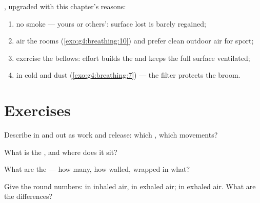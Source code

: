\begin{method}\label{met:g7:lungs-and-gas-exchange:keep}
, upgraded with this
chapter's reasons:
\begin{enumerate}
  \item no smoke --- yours or others': surface lost is
        barely regained;
  \item air the rooms (\cref{exo:g4:breathing:10}) and
        prefer clean outdoor air for sport;
  \item exercise the bellows:  effort
        builds the   and keeps the full
        surface ventilated;
  \item {} in cold and dust
        (\cref{exo:g4:breathing:7}) --- the filter
        protects the broom.
\end{enumerate}
\end{method}

\section{Exercises}

\begin{exercise}[$\star$]\label{exo:g7:lungs-and-gas-exchange:1}
Describe  in and  out as work and
release: which , which movements?
\end{exercise}

\begin{exercise}[$\star$]\label{exo:g7:lungs-and-gas-exchange:2}
What is the , and where does it sit?
\end{exercise}

\begin{exercise}[$\star$]\label{exo:g7:lungs-and-gas-exchange:3}
What are the  --- how many, how walled, wrapped
in what?
\end{exercise}

\begin{exercise}[$\star$]\label{exo:g7:lungs-and-gas-exchange:4}
Give the round numbers:  in inhaled air, in
exhaled air;  in exhaled air. What are the
differences?
\end{exercise}

